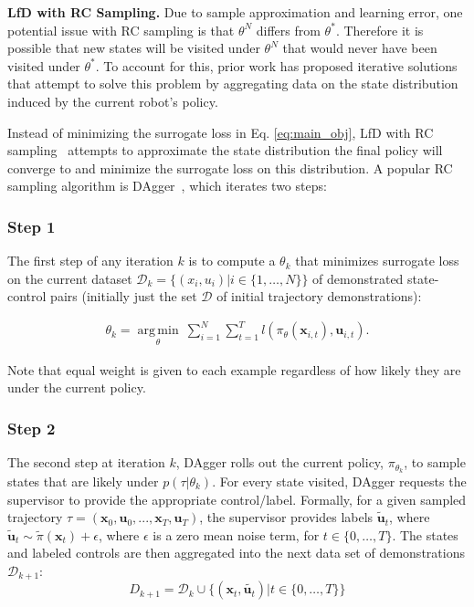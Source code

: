 \documentclass[10pt, conference]{ieeeconf}      %
\DeclareMathOperator*{\argmin}{arg\,min}
\newcommand{\bu}{\mathbf{u}}
\newcommand{\bx}{\mathbf{x}}
\newcommand{\nc}{RC }
\begin{document}
\noindent \textbf{LfD with \nc Sampling.}
Due to sample approximation and learning error, one potential issue with \nc sampling is that $\theta^N$ differs from $\theta^*$.
Therefore it is possible that new states will be visited under $\theta^N$ that would never have been visited under $\theta^*$.
To account for this, prior work has proposed iterative solutions~\cite{ross2010reduction} that attempt to solve this problem by aggregating data on the state distribution induced by the current robot's policy.

Instead of  minimizing the surrogate loss in Eq. \ref{eq:main_obj},  LfD with RC sampling~\cite{ross2010reduction,laskeyshiv,he2012imitation} attempts to approximate the state distribution the final policy will converge to and minimize the surrogate loss on this distribution.
A popular RC sampling algorithm is DAgger~\cite{ross2010reduction}, which iterates two steps:

\subsubsection{Step 1}
The first step of any iteration $k$ is to compute a $\theta_k$ that minimizes surrogate loss on the current dataset $\mathcal{D}_k=\{(x_i,u_i)|i\in\{1,\ldots,N\}\}$ of demonstrated state-control pairs (initially just the set $\mathcal{D}$ of initial trajectory demonstrations):

 \vspace{-1ex}
\begin{align}\label{eq:super_objj}
\theta_{k} = \underset{\theta}{\argmin} \: \sum_{i=1}^{N} \sum_{t=1}^T  l(\pi_{\theta}(\bx_{i,t}),\bu_{i,t}).
\end{align}

\noindent Note that equal weight is given to each example regardless of how likely they are under the current policy.
 

 \subsubsection{Step 2}
The second step at iteration $k$, DAgger rolls out the current policy, $\pi_{\theta_{k}}$, to sample states that are likely under $p(\tau|\theta_{k})$.  For every state visited, DAgger requests the supervisor to provide the appropriate control/label. Formally, for a given sampled trajectory  $\tau = (\bx_0,\bu_0,...,\bx_T,\bu_T )$, the supervisor provides labels $\tilde{\bu}_t$, where $\tilde{\bu}_t \sim \tilde{\pi}(\bx_t) + \epsilon$, where $\epsilon$ is a  zero mean noise term, for $t\in \{0, \ldots, T\}$.
The states and labeled controls are then aggregated into the next data set of demonstrations $\mathcal{D}_{k+1}$:
$$D_{k+1}=\mathcal{D}_k \cup \{(\bx_t,\tilde{\bu_t})|t\in\{0,\ldots,T\}\} $$
\end{document}
